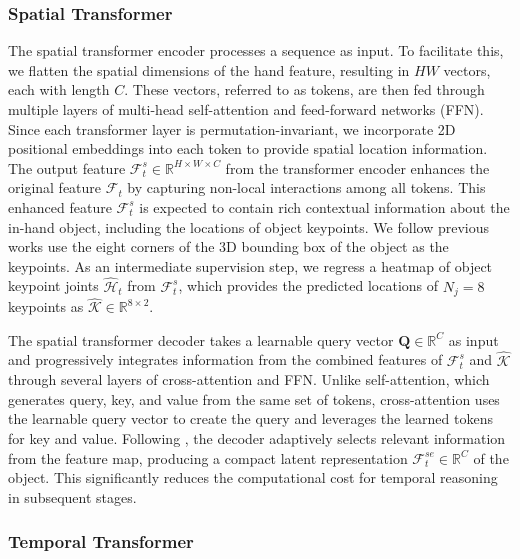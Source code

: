 \subsubsection{Spatial Transformer}

The spatial transformer encoder processes a sequence as input. To facilitate this, we flatten the spatial dimensions of the hand feature, resulting in $HW$ vectors, each with length $C$. These vectors, referred to as tokens, are then fed through multiple layers of multi-head self-attention and feed-forward networks (FFN). Since each transformer layer is permutation-invariant, we incorporate 2D positional embeddings into each token to provide spatial location information. The output feature $\mathcal{F}^s_t \in \mathbb{R}^{H \times W \times C}$ from the transformer encoder enhances the original feature $\mathcal{F}_t$ by capturing non-local interactions among all tokens. This enhanced feature $\mathcal{F}^s_t$ is expected to contain rich contextual information about the in-hand object, including the locations of object keypoints. We follow previous works \cite{oberweger2018making, tekin2018real, rad2017bb8} use the eight corners of the 3D bounding box of the object as the keypoints. As an intermediate supervision step, we regress a heatmap of object keypoint joints $\hat{\mathcal{H}}_t$ from $\mathcal{F}^s_t$, which provides the predicted locations of $N_j = 8$ keypoints as $\hat{\mathcal{K}} \in \mathbb{R}^{8 \times 2}$.

The spatial transformer decoder takes a learnable query vector $\mathbf{Q} \in \mathbb{R}^C$ as input and progressively integrates information from the combined features of $\mathcal{F}^s_t$ and $\hat{\mathcal{K}}$ through several layers of cross-attention and FFN. Unlike self-attention, which generates query, key, and value from the same set of tokens, cross-attention uses the learnable query vector to create the query and leverages the learned tokens for key and value. Following  \cite{jaegle2021perceiver}, the decoder adaptively selects relevant information from the feature map, producing a compact latent representation $\mathcal{F}^{se}_t \in \mathbb{R}^C$ of the object. This significantly reduces the computational cost for temporal reasoning in subsequent stages.

\subsubsection{Temporal Transformer}

